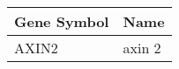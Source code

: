 \begin{tabular}{ll}
\toprule
Gene Symbol &   Name \\
\midrule
      AXIN2 & axin 2 \\
\bottomrule
\end{tabular}

